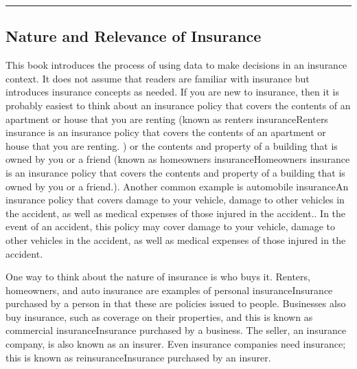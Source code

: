 \documentclass[]{book}
\theoremstyle{definition}
\theoremstyle{definition}
\theoremstyle{definition}
\theoremstyle{remark}
\begin{document}
\begin{center}\rule{0.5\linewidth}{\linethickness}\end{center}

\subsection{Nature and Relevance of
Insurance}\label{nature-and-relevance-of-insurance}

This book introduces the process of using data to make decisions in an
insurance context. It does not assume that readers are familiar with
insurance but introduces insurance concepts as needed. If you are new to
insurance, then it is probably easiest to think about an insurance
policy that covers the contents of an apartment or house that you are
renting (known as renters insurance{Renters insurance is an insurance
policy that covers the contents of an apartment or house that you are
renting.} ) or the contents and property of a building that is owned by
you or a friend (known as homeowners insurance{Homeowners insurance is
an insurance policy that covers the contents and property of a building
that is owned by you or a friend.}). Another common example is
automobile insurance{An insurance policy that covers damage to your
vehicle, damage to other vehicles in the accident, as well as medical
expenses of those injured in the accident.}. In the event of an
accident, this policy may cover damage to your vehicle, damage to other
vehicles in the accident, as well as medical expenses of those injured
in the accident.

One way to think about the nature of insurance is who buys it. Renters,
homeowners, and auto insurance are examples of personal
insurance{Insurance purchased by a person} in that these are policies
issued to people. Businesses also buy insurance, such as coverage on
their properties, and this is known as commercial insurance{Insurance
purchased by a business}. The seller, an insurance company, is also
known as an insurer. Even insurance companies need insurance; this is
known as reinsurance{Insurance purchased by an insurer}.
\end{document}
